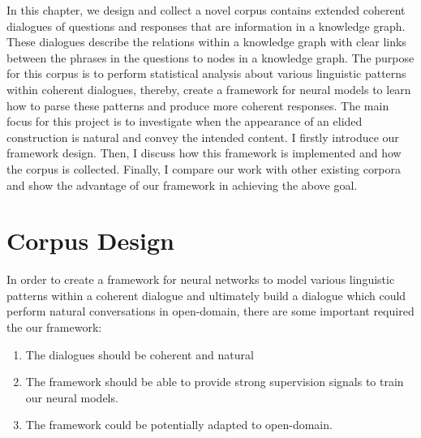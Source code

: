 \documentclass[bsc,frontabs,twoside,singlespacing,parskip,deptreport]{infthesis}     %
\begin{document}
In this chapter, we design and collect a novel corpus contains extended coherent dialogues of questions and responses that are information in a knowledge graph. These dialogues describe the relations within a knowledge graph with clear links between the phrases in the questions to nodes in a knowledge graph. The purpose for this corpus is to perform statistical analysis about various linguistic patterns within coherent dialogues, thereby, create a framework for neural models to learn how to parse these patterns and produce more coherent responses. The main focus for this project is to investigate when the appearance of an elided construction is natural and convey the intended content. I firstly introduce our framework design. Then, I discuss how this framework is implemented and how the corpus is collected. Finally, I compare our work with other existing corpora and show the advantage of our framework in achieving the above goal.

\section{Corpus Design}

In order to create a framework for neural networks to model various linguistic patterns within a coherent dialogue and ultimately build a dialogue which could perform natural conversations in open-domain, there are some important required the our framework:

\begin{enumerate}
   \item The dialogues should be coherent and natural
   
   \item The framework should be able to provide strong supervision signals to train our neural models. 
 
   \item The framework could be potentially adapted to open-domain.
\end{enumerate}
\end{document}
